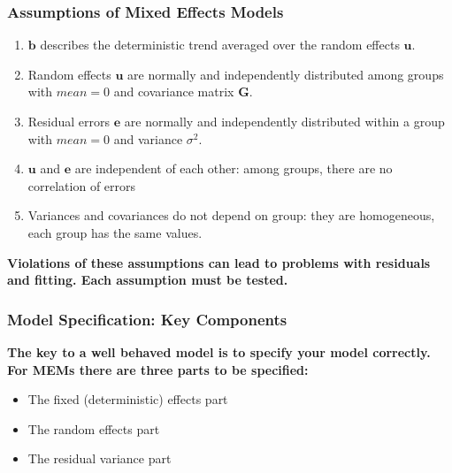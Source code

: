 \documentclass{beamer}
\begin{document}
\begin{frame}
    \frametitle{Assumptions of Mixed Effects Models}
    \begin{enumerate}
        \item $\mathbf{b}$ describes the deterministic trend averaged over the random effects $\mathbf{u}$.
        \item Random effects $\mathbf{u}$ are normally and independently distributed among groups with $\mathit{mean = 0}$ and covariance matrix $\mathbf{G}$.
        \item Residual errors $\mathbf{e}$ are normally and independently distributed within a group with $\mathit{mean = 0}$ and variance $\sigma^2$.
        \item $\mathbf{u}$ and $\mathbf{e}$ are independent of each other: among groups, there are no correlation of errors 
        \item Variances and covariances do not depend on group: they are homogeneous, each group has the same values.
    \end{enumerate}
    \vspace{0.2cm}
    
    \textbf{Violations of these assumptions can lead to problems with residuals and fitting. Each assumption must be tested.}
\end{frame}

\begin{frame}
    \frametitle{Model Specification: Key Components}
    \textbf{The key to a well behaved model is to specify your model correctly. For MEMs there are three parts to be specified:}
    \vspace{0.2cm}
    
    \begin{itemize}
        \item The fixed (deterministic) effects part
        \item The random effects part
        \item The residual variance part
    \end{itemize}
\end{frame}
\end{document}

